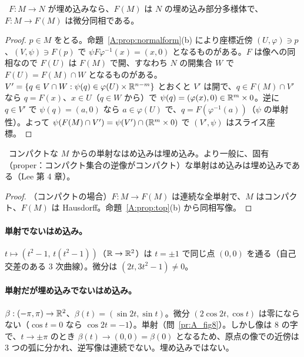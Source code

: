 \begin{prop}\label{A:prop:embedding}
\tP\ $F:M\to N$ が埋め込みなら、$F(M)$ は $N$ の埋め込み部分多様体で、$F:M\to F(M)$ は微分同相である。
\end{prop}
\begin{proof}
$p\in M$ をとる。命題~\ref{A:prop:normalform}(b) により座標近傍 $(U,\varphi)\ni p$、$(V,\psi)\ni F(p)$ で $\psi F\varphi^{-1}(x)=(x,0)$ となるものがある。$F$ は像への同相なので $F(U)$ は $F(M)$ で開、すなわち $N$ の開集合 $W$ で $F(U)=F(M)\cap W$ となるものがある。$V'=\{q\in V\cap W:\psi(q)\in\varphi(U)\times\mathbb R^{n-m}\}$ とおくと $V'$ は開で、$q\in F(M)\cap V'$ なら $q=F(x)$、$x\in U$（$q\in W$ から）で $\psi(q)=(\varphi(x),0)\in\mathbb R^m\times0$。逆に $q\in V'$ で $\psi(q)=(a,0)$ なら $a\in\varphi(U)$ で、$q=F(\varphi^{-1}(a))$（$\psi$ の単射性）。よって $\psi(F(M)\cap V')=\psi(V')\cap(\mathbb R^m\times0)$ で $(V',\psi)$ はスライス座標。
\end{proof}

\begin{prop}\label{A:prop:compactemb}
\tP\ コンパクトな $M$ からの単射なはめ込みは埋め込み。より一般に、固有（proper：コンパクト集合の逆像がコンパクト）な単射はめ込みは埋め込みである\tC（Lee 第 4 章）。
\end{prop}
\begin{proof}
（コンパクトの場合）$F:M\to F(M)$ は連続な全単射で、$M$ はコンパクト、$F(M)$ は Hausdorff。命題~\ref{A:prop:top}(b) から同相写像。
\end{proof}

\paragraph{単射でないはめ込み。}$t\mapsto(t^2-1,\,t(t^2-1))$（$\mathbb R\to\mathbb R^2$）は $t=\pm1$ で同じ点 $(0,0)$ を通る（自己交差のある 3 次曲線）。微分は $(2t,3t^2-1)\ne0$。

\paragraph{単射だが埋め込みでないはめ込み。}
\begin{ex}[8 の字]\label{A:ex:fig8}
$\beta:(-\pi,\pi)\to\mathbb R^2$、$\beta(t)=(\sin2t,\sin t)$。微分 $(2\cos2t,\cos t)$ は零にならない（$\cos t=0$ なら $\cos2t=-1$）。単射（問~\ref{pr:A_fig8}）。しかし像は 8 の字で、$t\to\pm\pi$ のとき $\beta(t)\to(0,0)=\beta(0)$ となるため、原点の像での近傍は 3 つの弧に分かれ、逆写像は連続でない。埋め込みではない。
\end{ex}

